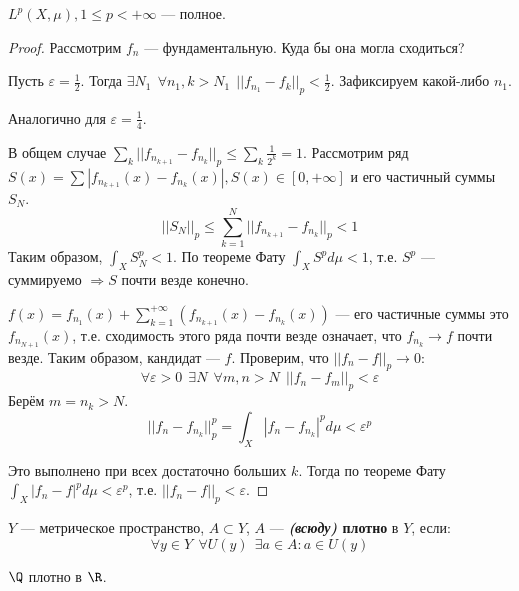 \begin{theorem}
    \(L^p(X, \mu), 1 \leq p < +\infty\) --- полное.
\end{theorem}
\begin{proof}
    Рассмотрим \(f_n\) --- фундаментальную. Куда бы она могла сходиться?

    Пусть \(\varepsilon = \frac{1}{2}\). Тогда \(\exists N_1 \ \ \forall n_1, k > N_1 \ \ ||f_{n_1} - f_k||_p < \frac{1}{2}\). Зафиксируем какой-либо \(n_1\).

    Аналогично для \(\varepsilon = \frac{1}{4}\).

    В общем случае \(\sum_k ||f_{n_{k+1}} - f_{n_k}||_p \leq \sum_k \frac{1}{2^k} = 1\). Рассмотрим ряд \(S(x) = \sum |f_{n_{k+1}}(x) - f_{n_k}(x)|, S(x) \in [0, +\infty]\) и его частичный суммы \(S_N\).
    \[||S_N||_p \leq \sum_{k = 1}^N ||f_{n_{k+1}} - f_{n_k}||_p < 1\]
    Таким образом, \(\int_X S_N^p < 1\). По теореме Фату \(\int_X S^p d\mu < 1\), т.е. \(S^p\) --- суммируемо \( \Rightarrow S\) почти везде конечно.

    \(f(x) = f_{n_1}(x) + \sum_{k = 1}^{+\infty} (f_{n_{k+1}}(x) - f_{n_k}(x))\) --- его частичные суммы это \(f_{n_{N+1}}(x)\), т.е. сходимость этого ряда почти везде означает, что \(f_{n_k} \to f\) почти везде. Таким образом, кандидат --- \(f\). Проверим, что \(||f_n - f||_p \to 0\):
    \[\forall \varepsilon > 0 \ \ \exists N \ \ \forall m,n > N \ \ ||f_n - f_m||_p < \varepsilon\]
    Берём \(m = n_k > N\).
    \[||f_n - f_{n_k}||_p^p = \int_X |f_n - f_{n_k}|^p d\mu < \varepsilon^p\]

    Это выполнено при всех достаточно больших \(k\). Тогда по теореме Фату \(\int_X |f_n - f|^p d\mu < \varepsilon^p\), т.е. \(||f_n - f||_p < \varepsilon\).
\end{proof}

\begin{definition}
    \(Y\) --- метрическое пространство, \(A \subset Y\), \(A\) --- \textbf{\textit{(всюду)} плотно} в \(Y\), если:
    \[\forall y\in Y \ \ \forall U(y) \ \ \exists a \in A : a\in U(y)\]
\end{definition}
\begin{example}
    \(\Q\) плотно в \(\R\).
\end{example}

